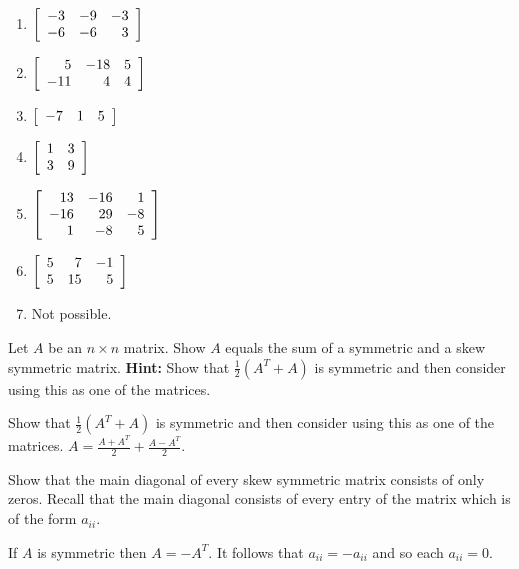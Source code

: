 \begin{enumialphparenastyle}
\begin{ex}
\begin{sol}
\begin{enumerate}
\item $\left[
\begin{array}{rrr}
-3 & -9 & -3 \\
-6 & -6 & 3
\end{array}
\right]$
\item $\left[
\begin{array}{rrr}
5 & -18 & 5 \\
-11 & 4 & 4
\end{array}
\right]$
\item $\left[
\begin{array}{rrr}
-7 & 1 & 5
\end{array}
\right]$
\item $\left[
\begin{array}{rr}
1 & 3 \\
3 & 9
\end{array}
\right]$
\item $\left[ \begin{array}{rrr}
13 & -16 & 1\\
-16 & 29 & -8 \\
1 & -8 & 5
\end{array}
\right]$
\item $\left[ \begin{array}{rrr}
5 & 7 & -1 \\
5 & 15 & 5 
\end{array}
\right]$
\item Not possible.
\end{enumerate}
\end{sol}
\end{ex}

\begin{ex} Let $A$ be an $n\times n$ matrix. Show $A$ equals the sum of a
symmetric and a skew symmetric matrix.  
\textbf{Hint: }Show that $
\frac{1}{2}\left( A^{T}+A\right) $ is symmetric and then consider using this
as one of the matrices. 
\begin{sol}
Show that $\frac{1}{2}\left( A^{T}+A\right) $ is symmetric and then consider using this
as one of the matrices. $A=\frac{A+A^{T}}{2}+\frac{A-A^{T}}{2}.$
\end{sol}
\end{ex}

\begin{ex} Show that the main diagonal of every skew symmetric matrix consists of only zeros. Recall that the main diagonal consists of every entry of the matrix which is of the form
$a_{ii}$. 
\begin{sol}
If $A$ is symmetric then $A=-A^{T}.$ It follows that $a_{ii}=-a_{ii}$ and so each $a_{ii}=0$.
\end{sol}
\end{ex}


\end{enumialphparenastyle}
